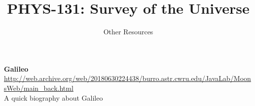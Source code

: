 \documentclass[10pt,letterpaper,oneside]{article}
\title{PHYS-131: Survey of the Universe}
\author{Other Resources}
\date{}
\begin{document}
\maketitle

\textbf{Galileo} \\
\url{http://web.archive.org/web/20180630224438/burro.astr.cwru.edu/JavaLab/MoonsWeb/main\_back.html} \\
A quick biography about Galileo
\vspace{5mm}
\end{document}
